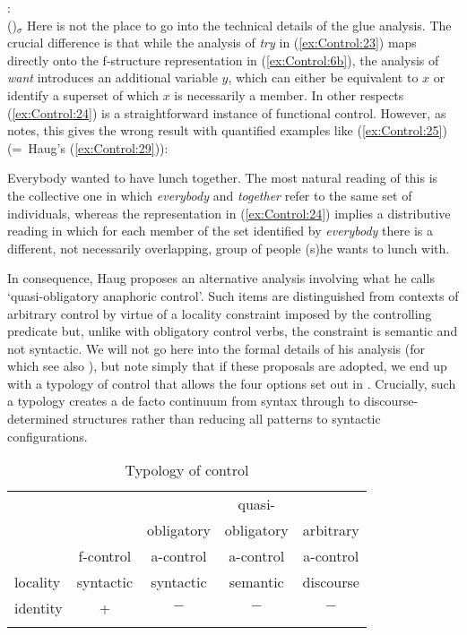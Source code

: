 \documentclass[output=paper,hidelinks]{langscibook}
\begin{document}
\ea\label{ex:Control:24}
 :\\
\hspace*{\fill}(\UP\SUBJ)$_\sigma$ \linimp [(\UP\XCOMP\SUBJ)$_\sigma$ \linimp (\UP\XCOMP)$_\sigma$] \linimp \UPS
\z
Here is not the place to go into the technical details of the glue analysis. The crucial difference is that while the analysis of \emph{try} in (\ref{ex:Control:23}) maps directly onto the f-structure representation in (\ref{ex:Control:6b}), the analysis of \emph{want} introduces an additional variable $y$, which can either be equivalent to $x$ or identify a superset of which $x$ is necessarily a member. In other respects (\ref{ex:Control:24}) is a straightforward instance of functional control. However, as \citet{Haug2013} notes, this gives the wrong result with quantified examples like (\ref{ex:Control:25}) (=~Haug's (\ref{ex:Control:29})):

\ea\label{ex:Control:25}
Everybody wanted to have lunch together.
\z
The most natural reading of this is the collective one in which \emph{everybody} and \emph{together} refer to the same set of individuals, whereas the representation in (\ref{ex:Control:24}) implies a distributive reading in which for each member of the set identified by \emph{everybody} there is a different, not necessarily overlapping, group of people (s)he wants to lunch with.

In consequence, Haug proposes an alternative analysis involving what he calls `quasi-obligatory anaphoric control'. Such items are distinguished from contexts of arbitrary control by virtue of a locality constraint imposed by the controlling predicate but, unlike with obligatory control verbs, the constraint is semantic and not syntactic. We will not go here into the formal details of his analysis (for which see also \citealt{Haug2014b}), but note simply that if these proposals are adopted, we end up with a typology of control that allows the four options set out in . Crucially, such a typology creates a de facto continuum from syntax through to discourse-determined structures rather than reducing all patterns to syntactic configurations.

\begin{table}[p]
\begin{tabularx}{\textwidth}{XCCCc}
\lsptoprule
&             &            & quasi- & \\
  &           & obligatory & obligatory  &arbitrary\\
  & f-control & a-control & a-control & a-control\\\hline
  locality & syntactic & syntactic & semantic & discourse\\
  identity & + & $-$ & $-$ & $-$  \\
  \lspbottomrule
\end{tabularx}
\caption{Typology of control \citep[61]{Haug2013}}\label{table:Control:1}
\end{table}
\end{document}
